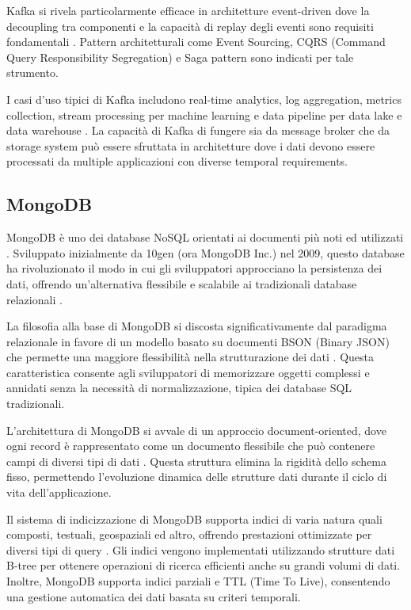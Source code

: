 Kafka si rivela particolarmente efficace in architetture event-driven dove la decoupling tra componenti e la capacità di replay degli eventi sono requisiti fondamentali \cite{stopford2018designing}. Pattern architetturali come Event Sourcing, CQRS (Command Query Responsibility Segregation) e Saga pattern sono indicati per tale strumento.

I casi d'uso tipici di Kafka includono real-time analytics, log aggregation, metrics collection, stream processing per machine learning e data pipeline per data lake e data warehouse \cite{kreps2014kafka}. La capacità di Kafka di fungere sia da message broker che da storage system può essere sfruttata in architetture dove i dati devono essere processati da multiple applicazioni con diverse temporal requirements.

\subsection{MongoDB}

MongoDB è uno dei database NoSQL orientati ai documenti più noti ed utilizzati \cite{chodorow2013mongodb}. Sviluppato inizialmente da 10gen (ora MongoDB Inc.) nel 2009, questo database ha rivoluzionato il modo in cui gli sviluppatori approcciano la persistenza dei dati, offrendo un'alternativa flessibile e scalabile ai tradizionali database relazionali \cite{banker2011mongodb}.

La filosofia alla base di MongoDB si discosta significativamente dal paradigma relazionale in favore di un modello basato su documenti BSON (Binary JSON) che permette una maggiore flessibilità nella strutturazione dei dati \cite{plugge2010mongodb}. Questa caratteristica consente agli sviluppatori di memorizzare oggetti complessi e annidati senza la necessità di normalizzazione, tipica dei database SQL tradizionali.

L'architettura di MongoDB si avvale di un approccio document-oriented, dove ogni record è rappresentato come un documento flessibile che può contenere campi di diversi tipi di dati \cite{harrison2015mongodb}. Questa struttura elimina la rigidità dello schema fisso, permettendo l'evoluzione dinamica delle strutture dati durante il ciclo di vita dell'applicazione.

Il sistema di indicizzazione di MongoDB supporta indici di varia natura quali composti, testuali, geospaziali ed altro, offrendo prestazioni ottimizzate per diversi tipi di query \cite{membrey2014definitive}. Gli indici vengono implementati utilizzando strutture dati B-tree per ottenere operazioni di ricerca efficienti anche su grandi volumi di dati. Inoltre, MongoDB supporta indici parziali e TTL (Time To Live), consentendo una gestione automatica dei dati basata su criteri temporali.

